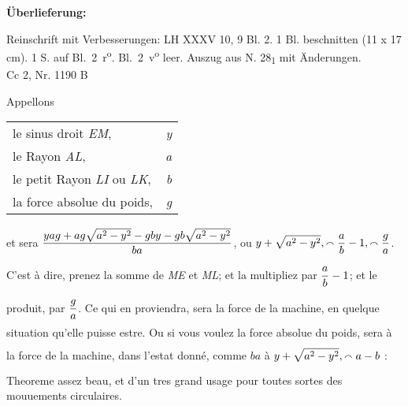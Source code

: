 \begin{ledgroupsized}[r]{120mm}
\footnotesize 
\pstart    
\noindent\textbf{\"{U}berlieferung:} 
\pend
\end{ledgroupsized}
\begin{ledgroupsized}[r]{114mm}
\footnotesize 
\pstart \parindent -6mm
%
Reinschrift mit Verbesserungen: LH XXXV 10, 9 Bl. 2. 1 Bl. beschnitten (11 x 17 cm). 1 S. auf Bl.~2~r\textsuperscript{o}. Bl.~2~v\textsuperscript{o}
leer. Auszug aus N. 28\textsubscript{1} mit Änderungen.\\
Cc 2, Nr. 1190 B
\pend
\end{ledgroupsized}

\vspace{8mm}
\pstart
\noindent
[2~r\textsuperscript{o}]
\pend
\pstart\noindent
\normalsize
Appellons \begin{tabular}[t]{lr}
le sinus droit \textit{EM},&\textit{y}\\
le Rayon \textit{AL},&\textit{a}\\
le petit Rayon \textit{LI} ou \textit{LK},&\textit{b}\\
la force absolue du poids,&\textit{g}\\
\end{tabular}
\pend
\vspace{0.5em}
\pstart \noindent et  sera $\rule[-4mm]{0mm}{10mm}\displaystyle\frac{yag + ag\sqrt{a^2 - y^2} - gby - gb\sqrt{a^2 - y^2}}{ba}$, ou $\rule[-4mm]{0mm}{10mm}\displaystyle y + \sqrt{a^2 - y^2}, \smallfrown \frac{a}{b} - 1, \smallfrown \frac{g}{a}$. C'est \`{a} dire, prenez la somme de \textit{ME} et \textit{ML}; et la multipliez par $\rule[-4mm]{0mm}{10mm}\displaystyle\frac{a}{b}-1$; et le produit, par $\rule[-4mm]{0mm}{10mm}\displaystyle\frac{g}{a}$. Ce qui en proviendra, sera la force de la machine\protect{}, en quelque situation qu'elle puisse estre. Ou si vous voulez la force absolue du poids\protect{}, sera \`{a} la force de la machine, dans l'estat donn\'{e}, comme $ba$ \`{a} $\rule[-4mm]{0mm}{10mm}\displaystyle y + \sqrt{a^2 - y^2}, \smallfrown a - b$ : Theoreme\protect{} assez beau, et d'un tres grand usage pour  toutes sortes des mouuements circulaires\protect{}.
\pend